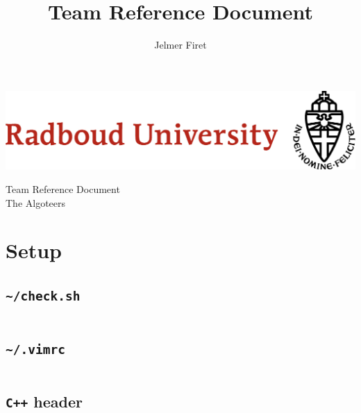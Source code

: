 \documentclass[8pt,a4paper,landscape,oneside]{amsart}
\title{Team Reference Document}
\author{Jelmer Firet}
\begin{document}
	\begin{multicols*}{2}
		\begin{center}			
		\begin{minipage}[c]{0.20\textwidth}
			\includegraphics[width=\textwidth]{resouce/radboud_logo_full.jpg}
		\end{minipage}\;
		\begin{minipage}[c]{0.16\textwidth}
			\LARGE Team Reference Document\\
			\Large The Algoteers
		\end{minipage}
		\end{center}
		\begin{multicols}{2}
			\tableofcontents
			\columnbreak
			\vfill\null
		\end{multicols}
		\vfill\null
		\columnbreak
		\section{Setup} %
		\begin{multicols*}{2}
			\subsection{\texttt{\textasciitilde/check.sh}}
			\inputminted[lastline=8]{sh}{_code/setup/check.sh}
			\subsection{\texttt{\textasciitilde/.vimrc}}
			\inputminted[lastline=9]{sh}{_code/setup/vimrc.sh}
			\columnbreak
			\subsection{\texttt{C++} header}
			\inputminted[lastline=17]{cpp}{_code/setup/header.cpp}
			\vfill\null
		\end{multicols*}

\end{multicols*}
\end{document}
